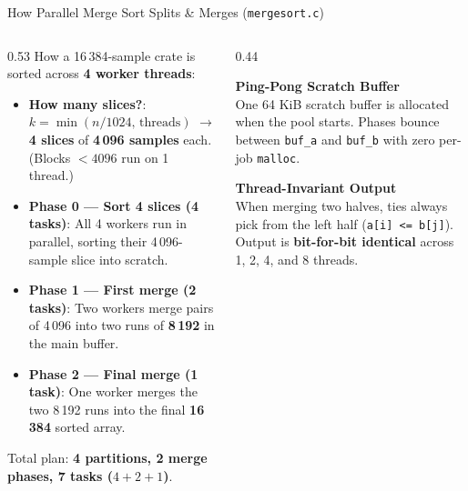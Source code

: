 \begin{frame}{How Parallel Merge Sort Splits \& Merges (\texttt{mergesort.c})}
  \begin{columns}[t, onlytextwidth]
    \begin{column}{0.53\textwidth}
      \smalltext\compactitem
      How a 16\,384-sample crate is sorted across \textbf{4 worker threads}:
      \begin{itemize}
        \item \textbf{How many slices?}: $k = \min(n / 1024,\, \text{threads})$ $\rightarrow$ \textbf{4 slices} of \textbf{4\,096 samples} each. (Blocks $<4096$ run on 1 thread.)
        \item \textbf{Phase 0 — Sort 4 slices (4 tasks)}: All 4 workers run in parallel, sorting their 4\,096-sample slice into scratch.
        \item \textbf{Phase 1 — First merge (2 tasks)}: Two workers merge pairs of 4\,096 into two runs of \textbf{8\,192} in the main buffer.
        \item \textbf{Phase 2 — Final merge (1 task)}: One worker merges the two 8\,192 runs into the final \textbf{16\,384} sorted array.
      \end{itemize}
      {\scriptsize Total plan: \textbf{4 partitions, 2 merge phases, 7 tasks ($4 + 2 + 1$)}.}
    \end{column}
    \begin{column}{0.44\textwidth}
      \smalltext\compactitem
      \begin{highlight}
        \textbf{Ping-Pong Scratch Buffer} \\
        One 64 KiB scratch buffer is allocated when the pool starts. Phases bounce between \texttt{buf\_a} and \texttt{buf\_b} with zero per-job \texttt{malloc}.
      \end{highlight}
      \vskip0.5mm
      \begin{tech}
        \textbf{Thread-Invariant Output} \\
        When merging two halves, ties always pick from the left half (\texttt{a[i] <= b[j]}). Output is \textbf{bit-for-bit identical} across 1, 2, 4, and 8 threads.
      \end{tech}
    \end{column}
  \end{columns}
\end{frame}

